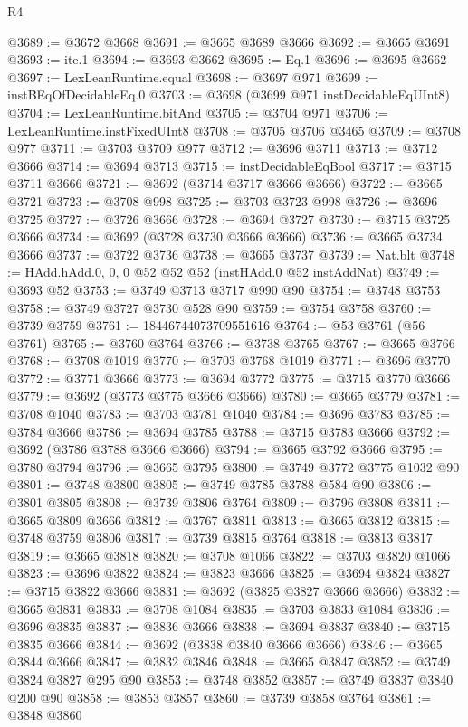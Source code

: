 \begin{lexlean}{R4}
\begin{coremodule}
@3689 := @3672 @3668
@3691 := @3665 @3689 @3666
@3692 := @3665 @3691
@3693 := ite.{1}
@3694 := @3693 @3662
@3695 := Eq.{1}
@3696 := @3695 @3662
@3697 := LexLeanRuntime.equal
@3698 := @3697 @971
@3699 := instBEqOfDecidableEq.{0}
@3703 := @3698 (@3699 @971 instDecidableEqUInt8)
@3704 := LexLeanRuntime.bitAnd
@3705 := @3704 @971
@3706 := LexLeanRuntime.instFixedUInt8
@3708 := @3705 @3706 @3465
@3709 := @3708 @977
@3711 := @3703 @3709 @977
@3712 := @3696 @3711
@3713 := @3712 @3666
@3714 := @3694 @3713
@3715 := instDecidableEqBool
@3717 := @3715 @3711 @3666
@3721 := @3692 (@3714 @3717 @3666 @3666)
@3722 := @3665 @3721
@3723 := @3708 @998
@3725 := @3703 @3723 @998
@3726 := @3696 @3725
@3727 := @3726 @3666
@3728 := @3694 @3727
@3730 := @3715 @3725 @3666
@3734 := @3692 (@3728 @3730 @3666 @3666)
@3736 := @3665 @3734 @3666
@3737 := @3722 @3736
@3738 := @3665 @3737
@3739 := Nat.blt
@3748 := HAdd.hAdd.{0, 0, 0} @52 @52 @52 (instHAdd.{0} @52 instAddNat)
@3749 := @3693 @52
@3753 := @3749 @3713 @3717 @990 @90
@3754 := @3748 @3753
@3758 := @3749 @3727 @3730 @528 @90
@3759 := @3754 @3758
@3760 := @3739 @3759
@3761 := 18446744073709551616
@3764 := @53 @3761 (@56 @3761)
@3765 := @3760 @3764
@3766 := @3738 @3765
@3767 := @3665 @3766
@3768 := @3708 @1019
@3770 := @3703 @3768 @1019
@3771 := @3696 @3770
@3772 := @3771 @3666
@3773 := @3694 @3772
@3775 := @3715 @3770 @3666
@3779 := @3692 (@3773 @3775 @3666 @3666)
@3780 := @3665 @3779
@3781 := @3708 @1040
@3783 := @3703 @3781 @1040
@3784 := @3696 @3783
@3785 := @3784 @3666
@3786 := @3694 @3785
@3788 := @3715 @3783 @3666
@3792 := @3692 (@3786 @3788 @3666 @3666)
@3794 := @3665 @3792 @3666
@3795 := @3780 @3794
@3796 := @3665 @3795
@3800 := @3749 @3772 @3775 @1032 @90
@3801 := @3748 @3800
@3805 := @3749 @3785 @3788 @584 @90
@3806 := @3801 @3805
@3808 := @3739 @3806 @3764
@3809 := @3796 @3808
@3811 := @3665 @3809 @3666
@3812 := @3767 @3811
@3813 := @3665 @3812
@3815 := @3748 @3759 @3806
@3817 := @3739 @3815 @3764
@3818 := @3813 @3817
@3819 := @3665 @3818
@3820 := @3708 @1066
@3822 := @3703 @3820 @1066
@3823 := @3696 @3822
@3824 := @3823 @3666
@3825 := @3694 @3824
@3827 := @3715 @3822 @3666
@3831 := @3692 (@3825 @3827 @3666 @3666)
@3832 := @3665 @3831
@3833 := @3708 @1084
@3835 := @3703 @3833 @1084
@3836 := @3696 @3835
@3837 := @3836 @3666
@3838 := @3694 @3837
@3840 := @3715 @3835 @3666
@3844 := @3692 (@3838 @3840 @3666 @3666)
@3846 := @3665 @3844 @3666
@3847 := @3832 @3846
@3848 := @3665 @3847
@3852 := @3749 @3824 @3827 @295 @90
@3853 := @3748 @3852
@3857 := @3749 @3837 @3840 @200 @90
@3858 := @3853 @3857
@3860 := @3739 @3858 @3764
@3861 := @3848 @3860

\end{coremodule}
\end{lexlean}
